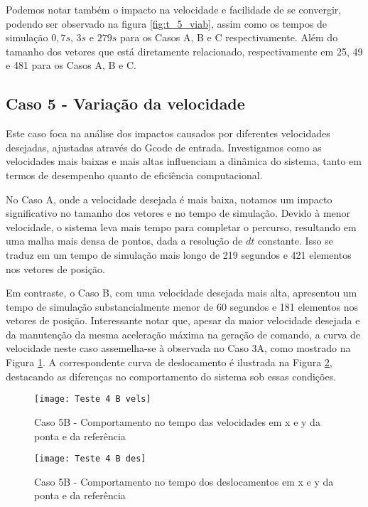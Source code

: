 Podemos notar também o impacto na velocidade e facilidade de se convergir, podendo ser observado na figura \ref{fig:t_5_viab}, assim
como os tempos de simulação $0,7 s$, $3 s$ e $279 s$ para os Casos A, B e C respectivamente. Além do tamanho dos vetores que está diretamente relacionado,
respectivamente em 25, 49 e 481 para os Casos A, B e C.
\subsection{Caso 5 - Variação da velocidade}
Este caso foca na análise dos impactos causados por diferentes velocidades desejadas, ajustadas através do Gcode de entrada. Investigamos como as velocidades mais baixas e mais altas influenciam a dinâmica do sistema, tanto em termos de desempenho quanto de eficiência computacional.

No Caso A, onde a velocidade desejada é mais baixa, notamos um impacto significativo no tamanho dos vetores e no tempo de simulação. Devido à menor velocidade, o sistema leva mais tempo para completar o percurso, resultando em uma malha mais densa de pontos, dada a resolução de \(dt\) constante. Isso se traduz em um tempo de simulação mais longo de 219 segundos e 421 elementos nos vetores de posição.

Em contraste, o Caso B, com uma velocidade desejada mais alta, apresentou um tempo de simulação substancialmente menor de 60 segundos e 181 elementos nos vetores de posição. Interessante notar que, apesar da maior velocidade desejada e da manutenção da mesma aceleração máxima na geração de comando, a curva de velocidade neste caso assemelha-se à observada no Caso 3A, como mostrado na Figura \ref{fig:t_4b_vels}. A correspondente curva de deslocamento é ilustrada na Figura \ref{fig:t_4b_des}, destacando as diferenças no comportamento do sistema sob essas condições.

\begin{figure}[H]
    \begin{center}
    \caption{Caso 5B - Comportamento no tempo das velocidades em x e y da ponta e da referência}
    \texttt{[image: Teste 4 B vels]}
    \label{fig:t_4b_vels}
    \end{center}
\end{figure}

\begin{figure}[H]
    \begin{center}
    \caption{Caso 5B - Comportamento no tempo dos deslocamentos em x e y da ponta e da referência}
    \texttt{[image: Teste 4 B des]}
    \label{fig:t_4b_des}
    \end{center}
\end{figure}

